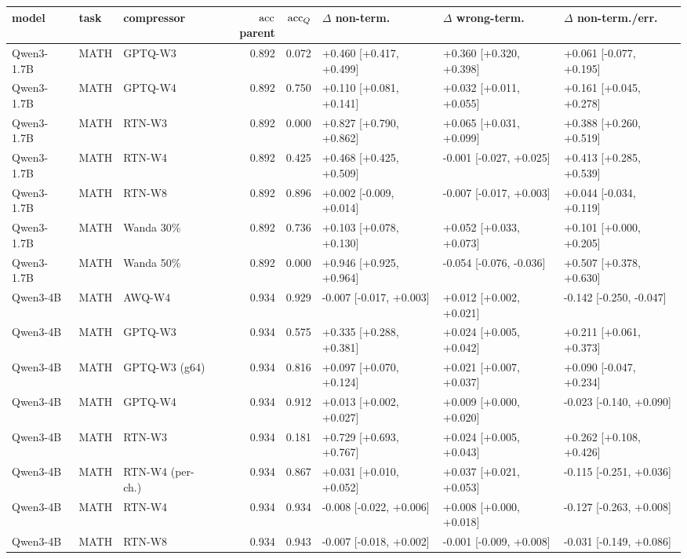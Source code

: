 \begin{tabular}{lllrrlll}
\toprule
model & task & compressor & $\mathrm{acc}$ parent & $\mathrm{acc}_Q$ & $\Delta$ non-term. & $\Delta$ wrong-term. & $\Delta$ non-term./err. \\
\midrule
Qwen3-1.7B & MATH & GPTQ-W3 & 0.892 & 0.072 & +0.460 [+0.417, +0.499] & +0.360 [+0.320, +0.398] & +0.061 [-0.077, +0.195] \\
Qwen3-1.7B & MATH & GPTQ-W4 & 0.892 & 0.750 & +0.110 [+0.081, +0.141] & +0.032 [+0.011, +0.055] & +0.161 [+0.045, +0.278] \\
Qwen3-1.7B & MATH & RTN-W3 & 0.892 & 0.000 & +0.827 [+0.790, +0.862] & +0.065 [+0.031, +0.099] & +0.388 [+0.260, +0.519] \\
Qwen3-1.7B & MATH & RTN-W4 & 0.892 & 0.425 & +0.468 [+0.425, +0.509] & -0.001 [-0.027, +0.025] & +0.413 [+0.285, +0.539] \\
Qwen3-1.7B & MATH & RTN-W8 & 0.892 & 0.896 & +0.002 [-0.009, +0.014] & -0.007 [-0.017, +0.003] & +0.044 [-0.034, +0.119] \\
Qwen3-1.7B & MATH & Wanda 30\% & 0.892 & 0.736 & +0.103 [+0.078, +0.130] & +0.052 [+0.033, +0.073] & +0.101 [+0.000, +0.205] \\
Qwen3-1.7B & MATH & Wanda 50\% & 0.892 & 0.000 & +0.946 [+0.925, +0.964] & -0.054 [-0.076, -0.036] & +0.507 [+0.378, +0.630] \\
Qwen3-4B & MATH & AWQ-W4 & 0.934 & 0.929 & -0.007 [-0.017, +0.003] & +0.012 [+0.002, +0.021] & -0.142 [-0.250, -0.047] \\
Qwen3-4B & MATH & GPTQ-W3 & 0.934 & 0.575 & +0.335 [+0.288, +0.381] & +0.024 [+0.005, +0.042] & +0.211 [+0.061, +0.373] \\
Qwen3-4B & MATH & GPTQ-W3 (g64) & 0.934 & 0.816 & +0.097 [+0.070, +0.124] & +0.021 [+0.007, +0.037] & +0.090 [-0.047, +0.234] \\
Qwen3-4B & MATH & GPTQ-W4 & 0.934 & 0.912 & +0.013 [+0.002, +0.027] & +0.009 [+0.000, +0.020] & -0.023 [-0.140, +0.090] \\
Qwen3-4B & MATH & RTN-W3 & 0.934 & 0.181 & +0.729 [+0.693, +0.767] & +0.024 [+0.005, +0.043] & +0.262 [+0.108, +0.426] \\
Qwen3-4B & MATH & RTN-W4 (per-ch.) & 0.934 & 0.867 & +0.031 [+0.010, +0.052] & +0.037 [+0.021, +0.053] & -0.115 [-0.251, +0.036] \\
Qwen3-4B & MATH & RTN-W4 & 0.934 & 0.934 & -0.008 [-0.022, +0.006] & +0.008 [+0.000, +0.018] & -0.127 [-0.263, +0.008] \\
Qwen3-4B & MATH & RTN-W8 & 0.934 & 0.943 & -0.007 [-0.018, +0.002] & -0.001 [-0.009, +0.008] & -0.031 [-0.149, +0.086] \\

\end{tabular}
